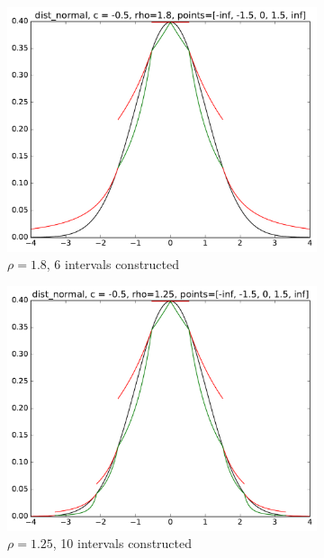 \begin{figure}[h]
    \centering
    \begin{subfigure}[b]{0.49\textwidth}
        \includegraphics[width=\textwidth]{figs/tf_example_normal_6.pdf}
        \caption{$\rho = 1.8$, 6 intervals constructed}
    \end{subfigure}
    \begin{subfigure}[b]{0.49\textwidth}
        \includegraphics[width=\textwidth]{figs/tf_example_normal_10.pdf}
        \caption{$\rho = 1.25$, 10 intervals constructed}
    \end{subfigure}
    \centering
    \begin{subfigure}[b]{0.49\textwidth}

\end{subfigure}
\end{figure}
